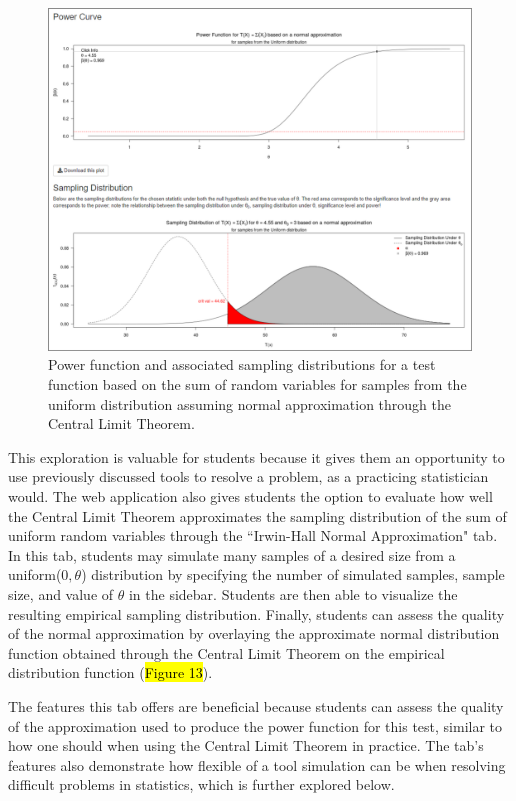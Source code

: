 \documentclass{TISE}
\begin{document}
\begin{figure}[H]
	\centering
	\includegraphics[width=\textwidth]{normapprox1.png}
	\caption{Power function and associated sampling distributions  for a test function based on the sum of random variables for samples from the uniform distribution assuming normal approximation through the Central Limit Theorem.}
\end{figure}

This exploration is valuable for students because it gives them an opportunity to use previously discussed tools to resolve a problem, as a practicing statistician would. The web application also gives students the option to evaluate how well the Central Limit Theorem approximates the sampling distribution of the sum of uniform random variables through the ``Irwin-Hall Normal Approximation" tab. In this tab, students may simulate many samples of a desired size from a uniform($0, \theta$) distribution by specifying the number of simulated samples, sample size, and value of $\theta$ in the sidebar. Students are then able to visualize the resulting empirical sampling distribution. Finally, students can assess the quality of the normal approximation by overlaying the approximate normal distribution function obtained through the Central Limit Theorem on the empirical distribution function (\hl{Figure 13}). 

The features this tab offers are beneficial because students can assess the quality of the approximation used to produce the power function for this test, similar to how one should when using the Central Limit Theorem in practice. The tab's features also demonstrate how flexible of a tool simulation can be when resolving difficult problems in statistics, which is further explored below. 
\end{document}
